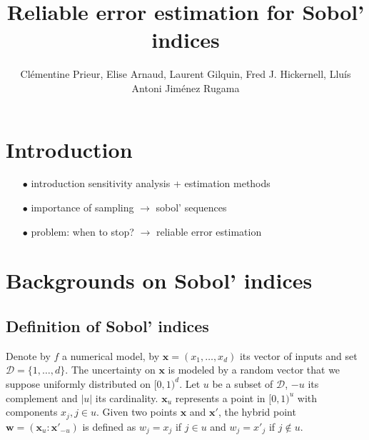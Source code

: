 \documentclass[]{elsarticle}
\theoremstyle{definition}
\newcommand{\cube}{[0,1)^d}
\newcommand{\bvec}[1]{\boldsymbol{#1}}
\newcommand{\vx}{\bvec{x}}
\newcommand{\vw}{\bvec{w}}
\begin{document}
\begin{frontmatter}

\title{Reliable error estimation for Sobol' indices}

\author{Cl\'ementine Prieur, Elise Arnaud, Laurent Gilquin, Fred J. Hickernell, Llu\'{i}s Antoni Jim\'{e}nez Rugama}
\address{U. Josef Fourier, Illinois Institute of Technology}
\begin{abstract}
\end{abstract}

\end{frontmatter}

\section{Introduction}

\begin{itemize}
\item[$\bullet$] introduction sensitivity analysis + estimation methods
\item[$\bullet$] importance of sampling $\rightarrow$ sobol' sequences
\item[$\bullet$] problem: when to stop? $\rightarrow$ reliable error estimation 
\end{itemize}

\section{Backgrounds on Sobol' indices}

\subsection{Definition of Sobol' indices}
Denote by $f$ a numerical model, by $\vx=(x_1,\dots,x_d)$ its vector of inputs and set $\mathcal{D}=\{1,\dots,d\}$. The uncertainty on $\vx$ is modeled by a random vector that we suppose uniformly distributed on $\cube$. Let $u$ be a subset of $\mathcal{D}$, $-u$ its complement and $|u|$ its cardinality. $\vx_u$ represents a point in $[0,1)^u$ with components $x_j, j \in u$. Given two points $\vx$ and $\vx'$, the hybrid point $\vw=(\vx_u:{\vx'}_{-u})$ is defined as $w_j=x_j$ if $j \in u$ and $w_j={x'}_j$ if $j \notin u$.
\end{document}
